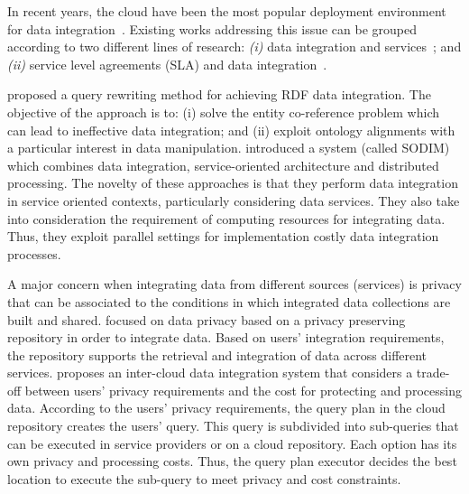 In recent years, the cloud have been the most popular deployment environment for data integration~\cite{Carvalho2015}. Existing works addressing this issue can be grouped according to two different lines of research:
\textit{(i)} data integration and services~\cite{Correndo2010,ElSheikh2013,Tian2010,YauY08}; and
\textit{(ii)} service level agreements (SLA) and data integration~\cite{Bennani2014,Nie07}. 

\cite{Correndo2010} proposed a query rewriting method for achieving RDF data integration. %
The objective of the approach is to: (i) solve the entity co-reference problem which can lead to ineffective data integration; and (ii) exploit ontology alignments with a particular interest in data manipulation. 
\cite{ElSheikh2013} introduced a system (called SODIM) which combines data integration, service-oriented architecture and distributed processing. %
The novelty of these approaches is that they perform data integration in service oriented contexts, particularly considering data services. They also take into consideration the requirement of computing resources for integrating data. Thus, they exploit parallel settings for implementation costly data integration processes. 

A major concern when integrating data from different sources (services) is privacy that can be associated to the conditions in which integrated data collections are built and shared.
\cite{YauY08} focused on data privacy based on  a privacy preserving repository in order to integrate data. 
Based on users' integration requirements, the repository supports the retrieval and integration of
data across different services. 
\cite{Tian2010} proposes an inter-cloud data integration system that considers a trade-off between users' privacy requirements and the cost for protecting and processing data. According to the users' privacy requirements, the query plan in the cloud repository creates the users' query. This query is subdivided into sub-queries that can
be executed in service providers or on a cloud repository. Each option has its own  privacy and processing costs.
Thus, the query plan executor decides the best location to execute the sub-query to meet privacy and cost constraints.

